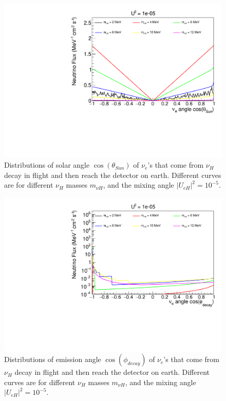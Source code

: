 \documentclass[%
 reprint,
 amsmath,amssymb,
 aps,
 prd,
floatfix,
twocolumn,
]{revtex4-1}
\begin{document}
\begin{figure}[!htbp]
\includegraphics[width=0.99\columnwidth]{../plots/DecayInFlightNuLCosthetaSun_U1e-05_AllMass_linXlinY.pdf}
\caption{Distributions of solar angle $\cos(\theta_{Sun})$ of $\nu_e$'s that come from $\nu_H$ decay in flight and then reach the detector on earth. Different curves are for different $\nu_H$ masses $m_{\nu H}$, and the mixing angle $|U_{eH}|^2 = 10^{-5}$.}
\label{fig:DecayInFlightTheta_U1em5_AllMass}
\end{figure}

\begin{figure}[!htbp]
\includegraphics[width=0.99\columnwidth]{../plots/DecayInFlightNuLCosphiSun_U1e-05_AllMass_linXlogY.pdf}
\caption{Distributions of emission angle $\cos(\phi_{decay})$ of $\nu_e$'s that come from $\nu_H$ decay in flight and then reach the detector on earth. Different curves are for different $\nu_H$ masses $m_{\nu H}$, and the mixing angle $|U_{eH}|^2 = 10^{-5}$.}
\label{fig:DecayInFlightPhi_U1em5_AllMass}
\end{figure}
\end{document}
